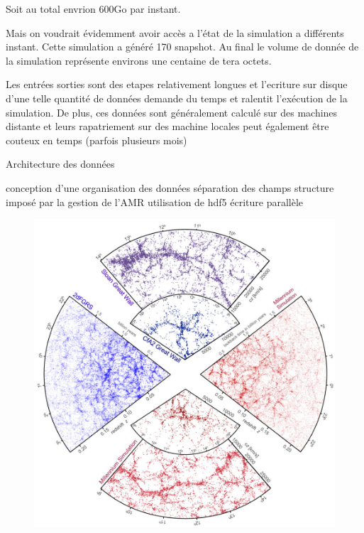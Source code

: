 Soit au total envrion 600Go par instant.

Mais on voudrait évidemment avoir accès a l'état de la simulation a différents instant.
Cette simulation a généré 170 snapshot.
Au final le volume de donnée de la simulation représente environs une centaine de tera octets.

Les entrées sorties sont des etapes relativement longues et l'ecriture sur disque d'une telle quantité de données demande du temps et ralentit l'exécution de la simulation.
De plus, ces données sont généralement calculé sur des machines distante et leurs rapatriement sur des machine locales peut également être couteux en temps (parfois plusieurs mois)

Architecture des données 

conception d'une organisation des données
séparation des champs
structure imposé par la gestion de l'AMR
utilisation de hdf5
écriture parallèle

%




\begin{figure}[bth]
        \includegraphics[width=.95\linewidth]{img/02/sdss_millenium.jpeg} 
        \caption{ 
}
 		\label{fig:}
\end{figure}

